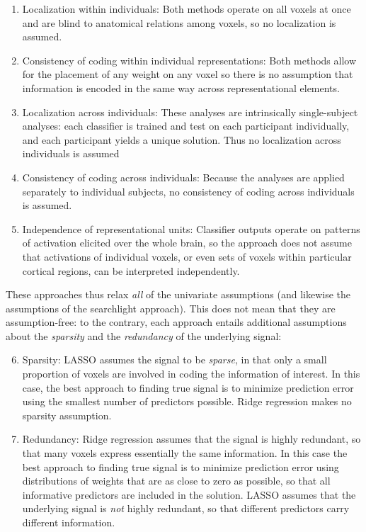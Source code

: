 \begin{enumerate}
\item Localization within individuals: Both methods operate on all voxels at once and are blind to anatomical relations among voxels, so no localization is assumed.

\item Consistency of coding within individual representations: Both methods allow for the placement of any weight on any voxel so there is no assumption that information is encoded in the same way across representational elements.

\item Localization across individuals: These analyses are intrinsically single-subject analyses: each classifier is trained and test on each participant individually, and each participant yields a unique solution. Thus no localization across individuals is assumed

\item Consistency of coding across individuals: Because the analyses are applied separately to individual subjects, no consistency of coding across individuals is assumed.

\item Independence of representational units: Classifier outputs operate on patterns of activation elicited over the whole brain, so the approach does not assume that activations of individual voxels, or even sets of voxels within particular cortical regions, can be interpreted independently.
\end{enumerate}

These approaches thus relax {\em all} of the univariate assumptions (and likewise the assumptions of the searchlight approach). This does not mean that they are assumption-free: to the contrary, each approach entails additional assumptions about the {\em sparsity} and the {\em redundancy} of the underlying signal:

\begin{enumerate}
\setcounter{enumi}{5}
\item Sparsity: LASSO assumes the signal to be {\em sparse}, in that only a small proportion of voxels are involved in coding the information of interest. In this case, the best approach to finding true signal is to minimize prediction error using the smallest number of predictors possible. Ridge regression makes no sparsity assumption.

\item Redundancy: Ridge regression assumes that the signal is highly redundant, so that many voxels express essentially the same information. In this case the best approach to finding true signal is to minimize prediction error using distributions of weights that are as close to zero as possible, so that all informative predictors are included in the solution. LASSO assumes that the underlying signal is {\em not} highly redundant, so that different predictors carry different information.
\end{enumerate}

